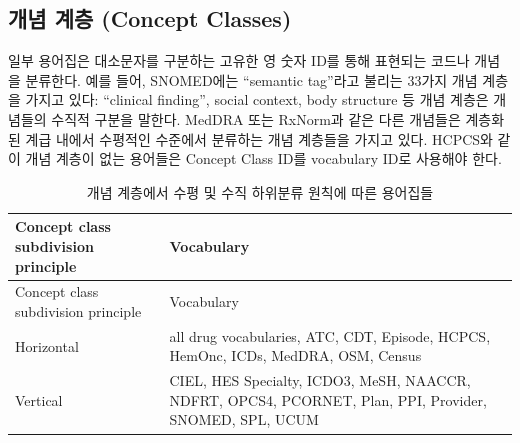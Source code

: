 \documentclass[11pt]{book}
\theoremstyle{definition}
\theoremstyle{definition}
\theoremstyle{definition}
\theoremstyle{remark}
\begin{document}
\subsection{개념 계층 (Concept Classes)}\label{--concept-classes}

일부 용어집은 대소문자를 구분하는 고유한 영 숫자 ID를 통해 표현되는
코드나 개념을 분류한다. 예를 들어, SNOMED에는 ``semantic tag''라고
불리는 33가지 개념 계층을 가지고 있다: ``clinical finding'', social
context, body structure 등 개념 계층은 개념들의 수직적 구분을 말한다.
MedDRA 또는 RxNorm과 같은 다른 개념들은 계층화된 계급 내에서 수평적인
수준에서 분류하는 개념 계층들을 가지고 있다. HCPCS와 같이 개념 계층이
없는 용어들은 Concept Class ID를 vocabulary ID로 사용해야 한다.

\begin{longtable}[]{@{}ll@{}}
\caption{\label{tab:sublassification}개념 계층에서 수평 및 수직 하위분류
원칙에 따른 용어집들}\tabularnewline
\toprule
\begin{minipage}[b]{0.13\columnwidth}\raggedright\strut
Concept class subdivision principle\strut
\end{minipage} & \begin{minipage}[b]{0.47\columnwidth}\raggedright\strut
Vocabulary\strut
\end{minipage}\tabularnewline
\midrule
\endfirsthead
\toprule
\begin{minipage}[b]{0.13\columnwidth}\raggedright\strut
Concept class subdivision principle\strut
\end{minipage} & \begin{minipage}[b]{0.47\columnwidth}\raggedright\strut
Vocabulary\strut
\end{minipage}\tabularnewline
\midrule
\endhead
\begin{minipage}[t]{0.13\columnwidth}\raggedright\strut
Horizontal\strut
\end{minipage} & \begin{minipage}[t]{0.47\columnwidth}\raggedright\strut
all drug vocabularies, ATC, CDТ, Episode, HCPCS, HemOnc, ICDs, MedDRA,
OSM, Census\strut
\end{minipage}\tabularnewline
\begin{minipage}[t]{0.13\columnwidth}\raggedright\strut
Vertical\strut
\end{minipage} & \begin{minipage}[t]{0.47\columnwidth}\raggedright\strut
CIEL, HES Specialty, ICDO3, MeSH, NAACCR, NDFRT, OPCS4, PCORNET, Plan,
PPI, Provider, SNOMED, SPL, UCUM\strut

\end{minipage}
\end{longtable}
\end{document}
